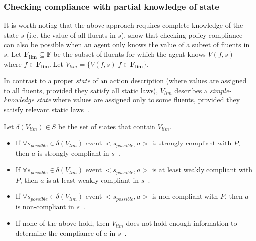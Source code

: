 \subsubsection{Checking compliance with partial knowledge of state}

It is worth noting that the above approach requires complete knowledge of the state $s$ (i.e. the value of all fluents in $s$).
\citet{gelfond_authorization_2008} show that checking policy compliance can also be possible when an agent only knows the value of a subset of fluents in $s$.
Let $\boldsymbol{F_{lim}} \subseteq \boldsymbol{F}$ be the subset of fluents for which the agent knows $V(f, s)$ where $f \in \boldsymbol{F_{lim}}$.
Let $V_{lim} = \{V(f, s) | f \in \boldsymbol{F_{lim}}\}$.

\begin{definition}
    \label{def:simple_knowledge_state}
    In contrast to a proper \textit{state} of an action description (where values are assigned to all fluents, provided they satisfy all static laws), $V_{lim}$ describes a \textit{simple-knowledge state} where values are assigned only to some fluents, provided they satisfy relevant static laws~\citep{gelfond_authorization_2008}.
\end{definition}

\begin{definition}
    Let $\delta(V_{lim}) \in S$ be the set of states that contain $V_{lim}$.

    \begin{itemize}
        \item If $\forall s_{possible} \in \delta(V_{lim})$ event $<s_{possible}, a>$ is strongly compliant with $P$, then $a$ is strongly compliant in $s$~\citep{gelfond_authorization_2008}.
        \item If $\forall s_{possible} \in \delta(V_{lim})$ event $<s_{possible}, a>$ is at least weakly compliant with $P$, then $a$ is at least weakly compliant in $s$~\citep{gelfond_authorization_2008}.
        \item If $\forall s_{possible} \in \delta(V_{lim})$ event $<s_{possible}, a>$ is non-compliant with $P$, then $a$ is non-compliant in $s$~\citep{gelfond_authorization_2008}.
        \item If none of the above hold, then $V_{lim}$ does not hold enough information to determine the compliance of $a$ in $s$~\citep{gelfond_authorization_2008}.
    \end{itemize}
\end{definition}

